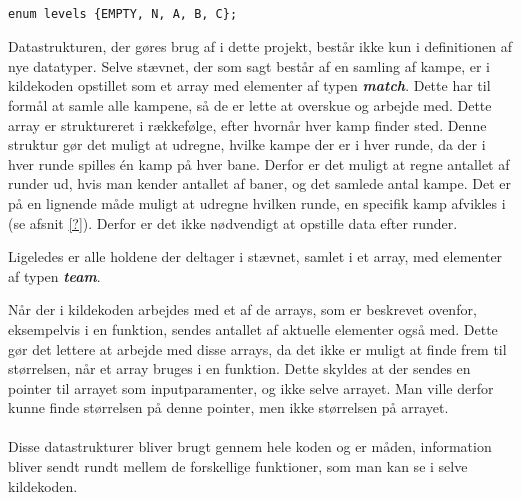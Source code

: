 \begin{listing}
\begin{verbatim}

enum levels {EMPTY, N, A, B, C};

\end{verbatim}
\label{code:levelEnum}
\end{listing}

Datastrukturen, der gøres brug af i dette projekt, består ikke kun i definitionen af nye datatyper. Selve stævnet, der som sagt består af en samling af kampe, er i kildekoden opstillet som et array med elementer af typen \textbf{\textit{match}}. Dette har til formål at samle alle kampene, så de er lette at overskue og arbejde med. Dette array er struktureret i rækkefølge, efter hvornår hver kamp finder sted. Denne struktur gør det muligt at udregne, hvilke kampe der er i hver runde, da der i hver runde spilles én kamp på hver bane. Derfor er det muligt at regne antallet af runder ud, hvis man kender antallet af baner, og det samlede antal kampe. Det er på en lignende måde muligt at udregne hvilken runde, en specifik kamp afvikles i (se afsnit \ref{?}). Derfor er det ikke nødvendigt at opstille data efter runder.
\par
Ligeledes er alle holdene der deltager i stævnet, samlet i et array, med elementer af typen \textbf{\textit{team}}.
\par
Når der i kildekoden arbejdes med et af de arrays, som er beskrevet ovenfor, eksempelvis i en funktion, sendes antallet af aktuelle elementer også med. Dette gør det lettere at arbejde med disse arrays, da det ikke er muligt at finde frem til størrelsen, når et array bruges i en funktion. Dette skyldes at der sendes en pointer til arrayet som inputparamenter, og ikke selve arrayet. Man ville derfor kunne finde størrelsen på denne pointer, men ikke størrelsen på arrayet.
\\\\
Disse datastrukturer bliver brugt gennem hele koden og er måden, information bliver sendt rundt mellem de forskellige funktioner, som man kan se i selve kildekoden.

